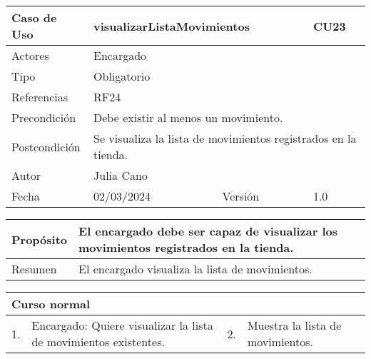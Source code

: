 \begin{table}[H]
	\centering
	\begin{tabular}{| m{} | m{} | m{} | m{}|}
		\hline
		\rowcolor{grayshade} Caso de Uso & \multicolumn{2}{|m{0.43\textwidth}|}{visualizarListaMovimientos} &  CU23\\ 
		\hline
		Actores & \multicolumn{3}{l|}{Encargado} \\ 
		\hline
		Tipo & \multicolumn{3}{l|}{Obligatorio} \\ 
		\hline
		Referencias & \multicolumn{3}{l|}{RF24} \\ 
		\hline
		Precondición & \multicolumn{3}{m{0.67\textwidth}|}{Debe existir al menos un movimiento.} \\ 
		\hline
		Postcondición & \multicolumn{3}{m{0.67\textwidth}|}{Se visualiza la lista de movimientos registrados en la tienda.} \\ 
		\hline
		Autor & \multicolumn{3}{l|}{Julia Cano} \\ 
		\hline
		Fecha & 02/03/2024 & Versión & 1.0 \\
		\hline
	\end{tabular}
\end{table}

\begin{table}[H]
	\centering
	\begin{tabular}{| m{} | m{} | m{} | m{} |}
		\hline
		Propósito & \multicolumn{3}{m{0.67\textwidth}|}{El encargado debe ser capaz de visualizar los movimientos registrados en la tienda.}  \\ 
		\hline
		Resumen & \multicolumn{3}{m{0.67\textwidth}|}{El encargado visualiza la lista de movimientos.} \\ 
		\hline
	\end{tabular}
\end{table}


\begin{table}[H]
	\centering
	\begin{tabular}{| m{} | m{} | m{} | m{} |}
		\hline
		\multicolumn{4}{|m{0.9\textwidth}|}{Curso normal}     \\ 
		\hline
		1. & Encargado: Quiere visualizar la lista de movimientos existentes. & 2. &  Muestra la lista de movimientos.  \\ 
		\hline
	\end{tabular}
\end{table}

